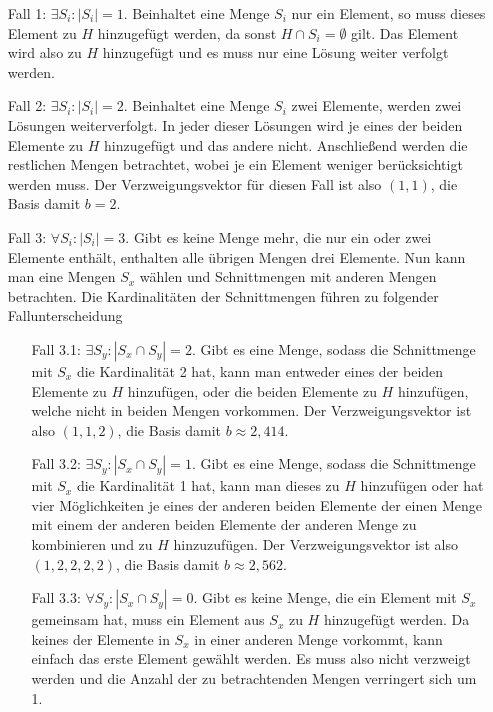\begin{itemize}
\item[Fall 1:]$\exists S_i: |S_i|=1$. Beinhaltet eine Menge $S_i$ nur ein Element, so muss dieses Element zu $H$ hinzugefügt werden, da sonst $H \cap S_i = \emptyset$ gilt. Das Element wird also zu $H$ hinzugefügt und es muss nur eine Lösung weiter verfolgt werden.

\item[Fall 2:]$\exists S_i: |S_i|=2$. Beinhaltet eine Menge $S_i$ zwei Elemente, werden zwei Lösungen weiterverfolgt. In jeder dieser Lösungen wird je eines der beiden Elemente zu $H$ hinzugefügt und das andere nicht. Anschließend werden die restlichen Mengen betrachtet, wobei je ein Element weniger berücksichtigt werden muss. Der Verzweigungsvektor für diesen Fall ist also $(1,1)$, die Basis damit $b=2$.

\item[Fall 3:]$\forall S_i: |S_i|=3$. Gibt es keine Menge mehr, die nur ein oder zwei Elemente enthält, enthalten alle übrigen Mengen drei Elemente. Nun kann man eine Mengen $S_x$ wählen und Schnittmengen mit anderen Mengen betrachten. Die Kardinalitäten der Schnittmengen führen zu folgender Fallunterscheidung

\begin{itemize}
\item[Fall 3.1:]$\exists S_y: |S_x \cap S_y| = 2$. Gibt es eine Menge, sodass die Schnittmenge mit $S_x$ die Kardinalität 2 hat, kann man entweder eines der beiden Elemente zu $H$ hinzufügen, oder die beiden Elemente zu $H$ hinzufügen, welche nicht in beiden Mengen vorkommen. Der Verzweigungsvektor ist also $(1,1,2)$, die Basis damit $b\approx 2,414$.

\item[Fall 3.2:]$\exists S_y: |S_x \cap S_y| = 1$. Gibt es eine Menge, sodass die Schnittmenge mit $S_x$ die Kardinalität 1 hat, kann man dieses zu $H$ hinzufügen oder hat vier Möglichkeiten je eines der anderen beiden Elemente der einen Menge mit einem der anderen beiden Elemente der anderen Menge zu kombinieren und zu $H$ hinzuzufügen. Der Verzweigungsvektor ist also $(1,2,2,2,2)$, die Basis damit $b\approx 2,562$.

\item[Fall 3.3:]$\forall S_y: |S_x \cap S_y| = 0$. Gibt es keine Menge, die ein Element mit $S_x$ gemeinsam hat, muss ein Element aus $S_x$ zu $H$ hinzugefügt werden. Da keines der Elemente in $S_x$ in einer anderen Menge vorkommt, kann einfach das erste Element gewählt werden. Es muss also nicht verzweigt werden und die Anzahl der zu betrachtenden Mengen verringert sich um 1.
\end{itemize}
\end{itemize}

